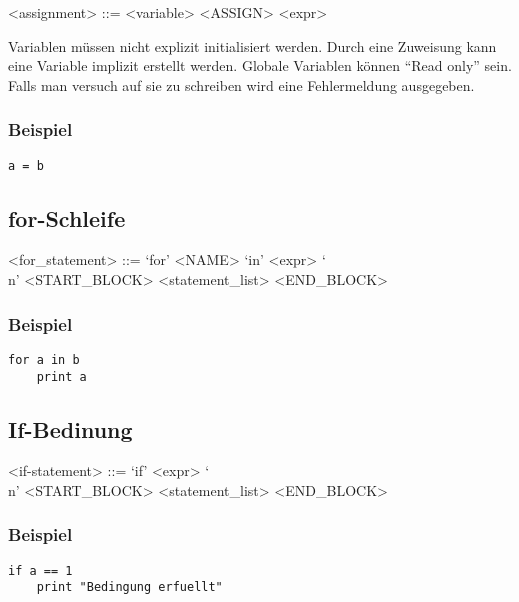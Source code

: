 \begin{grammar}
<assignment> ::= <variable> <ASSIGN> <expr>
\end{grammar}

Variablen müssen nicht explizit initialisiert werden. Durch eine Zuweisung kann eine Variable implizit erstellt werden. Globale Variablen können ``Read only'' sein. Falls man versuch auf sie zu schreiben wird eine Fehlermeldung ausgegeben.

\subsubsection{Beispiel}

\begin{lstlisting}
a = b
\end{lstlisting}

\subsection{for-Schleife}
\label{sub:for_schleife}

\begin{grammar}
  <for\_statement> ::= `for' <NAME> `in' <expr> `\\n' <START\_BLOCK> <statement\_list> <END\_BLOCK>
\end{grammar}

\subsubsection{Beispiel}

\begin{lstlisting}
for a in b
    print a
\end{lstlisting}

\subsection{If-Bedinung}
\label{sub:if_bedinung}

\begin{grammar}
<if-statement> ::= `if' <expr> `\\n' <START_BLOCK> <statement_list> <END_BLOCK>
\end{grammar}

\subsubsection{Beispiel}
\begin{lstlisting}
if a == 1
    print "Bedingung erfuellt"
\end{lstlisting}

